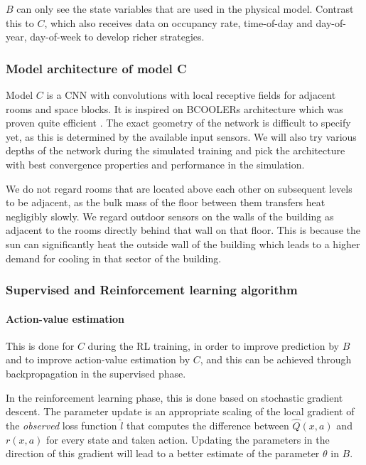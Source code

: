 \documentclass{article}
\theoremstyle{definition}
\theoremstyle{remark}
\begin{document}
$B$ can only see the state variables that are used in the physical model. Contrast this to $C$, which also receives data on occupancy rate, time-of-day and day-of-year, day-of-week to develop richer strategies.
\subsubsection{Model architecture of model C}
Model $C$ is a CNN with convolutions with local receptive fields for adjacent rooms and space blocks. It is inspired on BCOOLERs architecture which was proven quite efficient \cite{luo2022controlling}. The exact geometry of the network is difficult to specify yet, as this is determined by the available input sensors. We will also try various depths of the network during the simulated training and pick the architecture with best convergence properties and performance in the simulation. 

We do not regard rooms that are located above each other on subsequent levels to be adjacent, as the bulk mass of the floor between them transfers heat negligibly slowly. We regard outdoor sensors on the walls of the building as adjacent to the rooms directly behind that wall on that floor. This is because the sun can significantly heat the outside wall of the building which leads to a higher demand for cooling in that sector of the building.

\subsubsection{Supervised and Reinforcement learning algorithm} \label{Method:RLAlg}
\paragraph{Action-value estimation}
This is done for $C$ during the RL training, in order to improve prediction by $B$ and to improve action-value estimation by $C$, and this can be achieved through backpropagation \cite{suttonbarto2018, Szepesvari2010} in the supervised phase.

In the reinforcement learning phase, this is done based on stochastic gradient descent. The parameter update is an appropriate scaling of the local gradient of the \textit{observed} loss function $\hat l$ that computes the difference between $\hat Q(x,a)$ and $r(x,a)$ for every state and taken action. Updating the parameters in the direction of this gradient will lead to a better estimate of the parameter $\theta$ in $B$.
\end{document}
